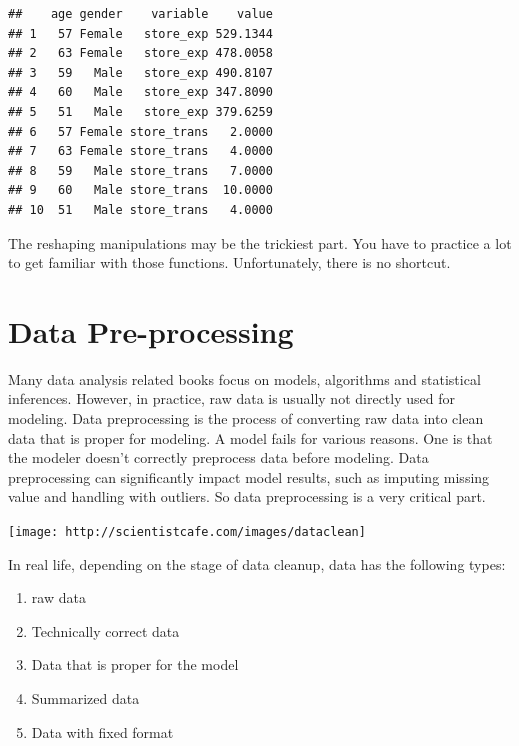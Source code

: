 \documentclass[]{book}
\newenvironment{Shaded}{\begin{snugshade}}{\end{snugshade}}
\newcommand{\KeywordTok}[1]{\textcolor[rgb]{0.13,0.29,0.53}{\textbf{{#1}}}}
\newcommand{\DataTypeTok}[1]{\textcolor[rgb]{0.13,0.29,0.53}{{#1}}}
\newcommand{\StringTok}[1]{\textcolor[rgb]{0.31,0.60,0.02}{{#1}}}
\newcommand{\NormalTok}[1]{{#1}}
\providecommand{\tightlist}{%
  \setlength{\itemsep}{0pt}\setlength{\parskip}{0pt}}
\theoremstyle{definition}
\theoremstyle{definition}
\theoremstyle{remark}
\begin{document}
\begin{Shaded}
\end{Shaded}

\begin{verbatim}
##    age gender    variable    value
## 1   57 Female   store_exp 529.1344
## 2   63 Female   store_exp 478.0058
## 3   59   Male   store_exp 490.8107
## 4   60   Male   store_exp 347.8090
## 5   51   Male   store_exp 379.6259
## 6   57 Female store_trans   2.0000
## 7   63 Female store_trans   4.0000
## 8   59   Male store_trans   7.0000
## 9   60   Male store_trans  10.0000
## 10  51   Male store_trans   4.0000
\end{verbatim}

The reshaping manipulations may be the trickiest part. You have to
practice a lot to get familiar with those functions. Unfortunately,
there is no shortcut.

\chapter{Data Pre-processing}\label{data-pre-processing}

Many data analysis related books focus on models, algorithms and
statistical inferences. However, in practice, raw data is usually not
directly used for modeling. Data preprocessing is the process of
converting raw data into clean data that is proper for modeling. A model
fails for various reasons. One is that the modeler doesn't correctly
preprocess data before modeling. Data preprocessing can significantly
impact model results, such as imputing missing value and handling with
outliers. So data preprocessing is a very critical part.

\begin{center}\texttt{[image: http://scientistcafe.com/images/dataclean]} \end{center}

In real life, depending on the stage of data cleanup, data has the
following types:

\begin{enumerate}
\def\labelenumi{\arabic{enumi}.}
\tightlist
\item
  raw data
\item
  Technically correct data
\item
  Data that is proper for the model
\item
  Summarized data
\item
  Data with fixed format
\end{enumerate}
\end{document}
